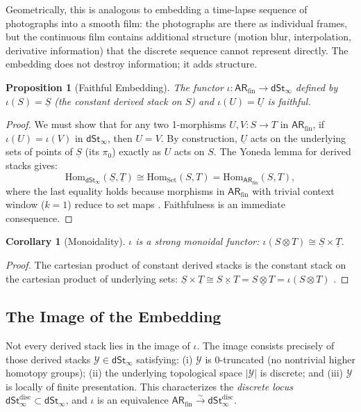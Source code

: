 \documentclass[a4paper,12pt]{article}
\newtheorem{proposition}[theorem]{Proposition}
\newtheorem{corollary}[theorem]{Corollary}
\theoremstyle{definition}
\newcommand{\ARfin}{\mathsf{AR}_{\mathrm{fin}}}
\newcommand{\dSt}{\mathsf{dSt}_\infty}
\newcommand{\iotaf}{\iota}
\begin{document}
Geometrically, this is analogous to embedding a time-lapse sequence of photographs into a smooth film: the photographs are there as individual frames, but the continuous film contains additional structure (motion blur, interpolation, derivative information) that the discrete sequence cannot represent directly. The embedding does not destroy information; it adds structure.

\begin{proposition}[Faithful Embedding]
\label{prop:embedding}
The functor $\iotaf: \ARfin \to \dSt$ defined by $\iotaf(S) = \underline{S}$ (the constant derived stack on $S$) and $\iotaf(U) = \underline{U}$ is faithful.
\end{proposition}

\begin{proof}
We must show that for any two 1-morphisms $U, V: S \to T$ in $\ARfin$, if $\iotaf(U) = \iotaf(V)$ in $\dSt$, then $U = V$. By construction, $\underline{U}$ acts on the underlying sets of points of $\underline{S}$ (its $\pi_0$) exactly as $U$ acts on $S$. The Yoneda lemma for derived stacks gives:
\[
\mathrm{Hom}_{\dSt}(\underline{S}, \underline{T}) \cong \mathrm{Hom}_{\mathrm{Set}}(S, T) = \mathrm{Hom}_{\ARfin}(S, T),
\]
where the last equality holds because morphisms in $\ARfin$ with trivial context window ($k = 1$) reduce to set maps \cite{Lurie2009, Eilenberg1945}. Faithfulness is an immediate consequence.
\end{proof}

\begin{corollary}[Monoidality]
\label{cor:monoidal}
$\iotaf$ is a strong monoidal functor: $\iotaf(S \otimes T) \cong \underline{S} \times \underline{T}$.
\end{corollary}

\begin{proof}
The cartesian product of constant derived stacks is the constant stack on the cartesian product of underlying sets: $\underline{S} \times \underline{T} \cong \underline{S \times T} = \underline{S \otimes T} = \iotaf(S \otimes T)$ \cite{Toen2014}.
\end{proof}

\subsection{The Image of the Embedding}

Not every derived stack lies in the image of $\iotaf$. The image consists precisely of those derived stacks $\mathcal{Y} \in \dSt$ satisfying: (i) $\mathcal{Y}$ is $0$-truncated (no nontrivial higher homotopy groups); (ii) the underlying topological space $|\mathcal{Y}|$ is discrete; and (iii) $\mathcal{Y}$ is locally of finite presentation. This characterizes the \emph{discrete locus} $\dSt^{\mathrm{disc}} \subset \dSt$, and $\iotaf$ is an equivalence $\ARfin \xrightarrow{\sim} \dSt^{\mathrm{disc}}$.
\end{document}
